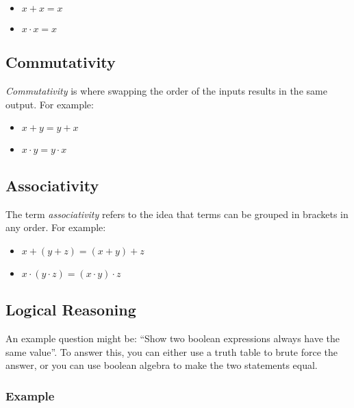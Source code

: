 \begin{itemize}
    \item \(x + x = x\)
    \item \(x \cdot x = x\)
\end{itemize}

\subsection{Commutativity}\label{sub:commutativity}

\emph{Commutativity} is where swapping the order of the inputs results in the same output.
For example:

\begin{itemize}
    \item \(x+y=y+x\)
    \item \(x \cdot y = y \cdot x\)
\end{itemize}

\subsection{Associativity}\label{sub:associativity}

The term \emph{associativity} refers to the idea that terms can be grouped in brackets in any order.
For example:

\begin{itemize}
    \item \(x + (y + z) = (x + y) + z\)
    \item \(x \cdot (y \cdot z) = (x \cdot y) \cdot z\)
\end{itemize}

\subsection{Logical Reasoning}\label{sub:logical_reasoning}

An example question might be: ``Show two boolean expressions always have the same value''.
To answer this, you can either use a truth table to brute force the answer, or you can use boolean algebra to make the two statements equal.

\subsubsection{Example}\label{ssub:example}

